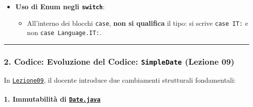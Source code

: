 \documentclass[11pt,a4paper]{article}
\newcommand{\passthrough}[1]{#1}
\providecommand{\tightlist}{\setlength{\itemsep}{0pt}\setlength{\parskip}{0pt}}
\begin{document}
\begin{itemize}
  \begin{itemize}
  \tightlist
  \item
    La JVM garantisce che in memoria esista \textbf{una e una sola
    istanza} per ciascuna costante di un enum (\emph{garanzia di unicità
    singleton}).
  \item
    Pertanto, il confronto con \textbf{\passthrough{\lstinline!==!}} è
    perfettamente sicuro ed è \textbf{più robusto di
    \passthrough{\lstinline!.equals()!}}: se una variabile vale
    \passthrough{\lstinline!null!}, l'espressione
    \passthrough{\lstinline!move == Direction.WEST!} restituisce
    \passthrough{\lstinline!false!} senza errori, mentre
    \passthrough{\lstinline!move.equals(...)!} causerebbe un crash con
    \passthrough{\lstinline!NullPointerException!}!
  \end{itemize}
\item
  \textbf{Uso di Enum negli \passthrough{\lstinline!switch!}}:

  \begin{itemize}
  \tightlist
  \item
    All'interno dei blocchi \passthrough{\lstinline!case!}, \textbf{non
    si qualifica} il tipo: si scrive \passthrough{\lstinline!case IT:!}
    e non \passthrough{\lstinline!case Language.IT:!}.
  \end{itemize}
\end{itemize}

\begin{center}\rule{0.5\linewidth}{0.5pt}\end{center}

\subsubsection{\texorpdfstring{2. Codice: Evoluzione del Codice:
\texttt{SimpleDate} (Lezione
09)}{2. Codice: Evoluzione del Codice: SimpleDate (Lezione 09)}}\label{codice-evoluzione-del-codice-simpledate-lezione-09}

In
\href{file:///home/wally/Documenti/GitHub/Programmazione-II/25-26/Teoria-e-Esercitazioni/Codice-20260902/Lezione09/SimpleDate/src}{\passthrough{\lstinline!Lezione09!}},
il docente introduce due cambiamenti strutturali fondamentali:

\paragraph{\texorpdfstring{1. Immutabilità di
\href{file:///home/wally/Documenti/GitHub/Programmazione-II/25-26/Teoria-e-Esercitazioni/Codice-20260902/Lezione09/SimpleDate/src/Date.java}{\texttt{Date.java}}}{1. Immutabilità di Date.java}}\label{immutabilituxe0-di-date.java}
\end{document}
